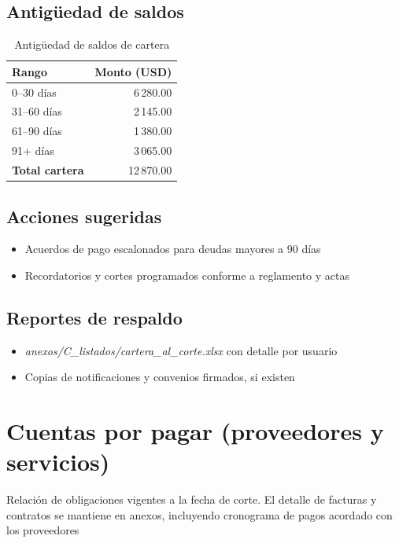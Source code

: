 \subsection*{Antigüedad de saldos}
\begin{table}[H]
\centering
\caption{Antigüedad de saldos de cartera}
\label{tab:cartera_antiguedad}
\begin{singlespace}
\begin{tabular}{p{9cm} r}
\toprule
\textbf{Rango} & \textbf{Monto (USD)} \\
\midrule
0–30 días & 6\,280.00 \\
31–60 días & 2\,145.00 \\
61–90 días & 1\,380.00 \\
91+ días & 3\,065.00 \\
\midrule
\textbf{Total cartera} & 12\,870.00 \\
\bottomrule
\end{tabular}
\end{singlespace}
\end{table}

\subsection*{Acciones sugeridas}
\begin{itemize}
  \item Acuerdos de pago escalonados para deudas mayores a 90 días
  \item Recordatorios y cortes programados conforme a reglamento y actas
\end{itemize}

\subsection*{Reportes de respaldo}
\begin{itemize}
  \item \emph{anexos/C\_listados/cartera\_al\_corte.xlsx} con detalle por usuario
  \item Copias de notificaciones y convenios firmados, si existen
\end{itemize}

\section{Cuentas por pagar (proveedores y servicios)}
\label{sec:cuentas_por_pagar}

Relación de obligaciones vigentes a la fecha de corte. El detalle de facturas y contratos se mantiene en anexos, incluyendo cronograma de pagos acordado con los proveedores

